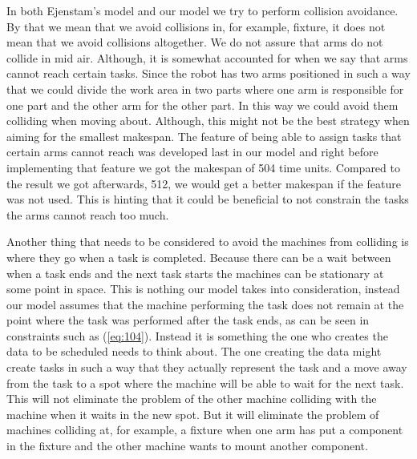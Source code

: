 In both Ejenstam's model and our model we try to perform collision avoidance. By that we mean that we avoid collisions in, for example, fixture, it does not mean that we avoid collisions altogether. We do not assure that arms do not collide in mid air. Although, it is somewhat accounted for when we say that arms cannot reach certain tasks. Since the robot has two arms positioned in such a way that we could divide the work area in two parts where one arm is responsible for one part and the other arm for the other part. In this way we could avoid them colliding when moving about. Although, this might not be the best strategy when aiming for the smallest makespan. The feature of being able to assign tasks that certain arms cannot reach was developed last in our model and right before implementing that feature we got the makespan of 504 time units. Compared to the result we got afterwards, 512, we would get a better makespan if the feature was not used. This is hinting that it could be beneficial to not constrain the tasks the arms cannot reach too much.

Another thing that needs to be considered to avoid the machines from colliding is where they go when a task is completed. Because there can be a wait between when a task ends and the next task starts the machines can be stationary at some point in space. This is nothing our model takes into consideration, instead our model assumes that the machine performing the task does not remain at the point where the task was performed after the task ends, as can be seen in constraints such as (\ref{eq:104}). Instead it is something the one who creates the data to be scheduled needs to think about. The one creating the data might create tasks in such a way that they actually represent the task and a move away from the task to a spot where the machine will be able to wait for the next task. This will not eliminate the problem of the other machine colliding with the machine when it waits in the new spot. But it will eliminate the problem of machines colliding at, for example, a fixture when one arm has put a component in the fixture and the other machine wants to mount another component.

